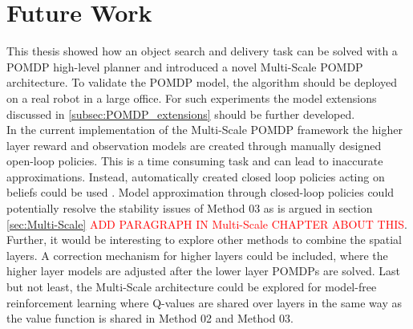 \section{Future Work}
This thesis showed how an object search and delivery task can be solved with a POMDP high-level planner and introduced a novel Multi-Scale POMDP architecture. To validate the POMDP model, the algorithm should be deployed on a real robot in a large office. For such experiments the model extensions discussed in \ref{subsec:POMDP_extensions} should be further developed.\\

In the current implementation of the Multi-Scale POMDP framework the higher layer reward and observation models are created through manually designed open-loop policies. This is a time consuming task and can lead to inaccurate approximations. Instead, automatically created closed loop policies acting on beliefs could be used \cite{7140035}. Model approximation through closed-loop policies could potentially resolve the stability issues of Method 03 as is argued in section \ref{sec:Multi-Scale} \textcolor{red}{ADD PARAGRAPH IN Multi-Scale CHAPTER ABOUT THIS}. Further, it would be interesting to explore other methods to combine the spatial layers. A correction mechanism for higher layers could be included, where the higher layer models are adjusted after the lower layer POMDPs are solved. Last but not least, the Multi-Scale architecture could be explored for model-free reinforcement learning where Q-values are shared over layers in the same way as the value function is shared in Method 02 and Method 03. 
 